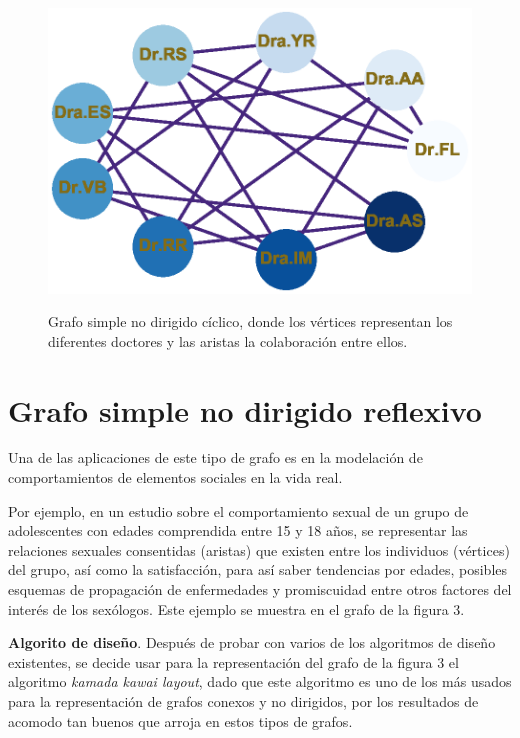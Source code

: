 \documentclass{article}
\begin{document}
    
\begin{center}

\end{center}
\begin{figure}[ht]
\begin{center}
\includegraphics[scale=0.7]{Graf2_circular_layout.eps}\\
\caption{Grafo simple no dirigido cíclico, donde los vértices representan los diferentes doctores y las aristas la colaboración entre ellos.}
\end{center}

\end{figure}

\newpage
\section{Grafo simple no dirigido reflexivo}
Una de las aplicaciones de este tipo de grafo es en la modelación de comportamientos de elementos sociales en la vida real.

Por ejemplo, en un estudio sobre el comportamiento sexual de un grupo de adolescentes con edades comprendida entre 15 y 18 años, se representar las relaciones sexuales consentidas (aristas) que existen entre los individuos (vértices) del grupo, así como la satisfacción, para así saber tendencias por edades, posibles esquemas de propagación de enfermedades y promiscuidad entre otros factores del interés de los sexólogos. Este ejemplo se muestra en el grafo de la figura 3.

\textbf{Algorito de diseño}.
Después de probar con varios de los algoritmos de diseño existentes, se decide usar para la representación del grafo de la figura 3 el algoritmo \textit{kamada kawai layout}, dado que este algoritmo es uno de los más usados para la representación de grafos conexos y no dirigidos, por los resultados de acomodo tan buenos que arroja en estos tipos de grafos.
\end{document}
